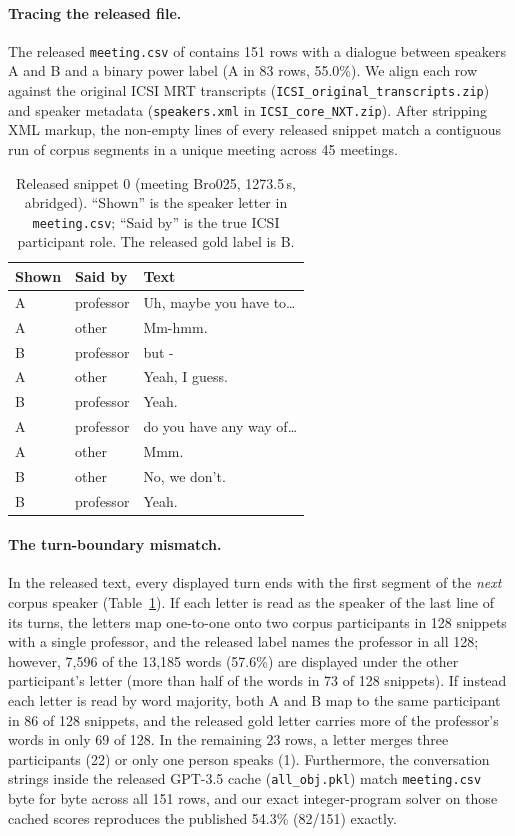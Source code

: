 \documentclass[11pt]{article}
\begin{document}
\paragraph{Tracing the released file.}
The released \texttt{meeting.csv} of \citet{wu2025power} contains 151 rows with a dialogue between speakers A and B and a binary power label (A in 83 rows, 55.0\%).
We align each row against the original ICSI MRT transcripts (\texttt{ICSI\_original\_transcripts.zip}) and speaker metadata (\texttt{speakers.xml} in \texttt{ICSI\_core\_NXT.zip}).
After stripping XML markup, the non-empty lines of every released snippet match a contiguous run of corpus segments in a unique meeting across 45 meetings.

\begin{table}[t]
\centering\small
\begin{tabular}{lll}
\toprule
Shown & Said by & Text \\
\midrule
A & professor & Uh, maybe you have to\ldots \\
A & other & Mm-hmm. \\
B & professor & but - \\
A & other & Yeah, I guess. \\
B & professor & Yeah. \\
A & professor & do you have any way of\ldots \\
A & other & Mmm. \\
B & other & No, we don't. \\
B & professor & Yeah. \\
\bottomrule
\end{tabular}
\caption{Released snippet 0 (meeting Bro025, 1273.5\,s, abridged). ``Shown'' is the speaker letter in \texttt{meeting.csv}; ``Said by'' is the true ICSI participant role. The released gold label is B.}
\label{tab:example}
\end{table}

\paragraph{The turn-boundary mismatch.}
In the released text, every displayed turn ends with the first segment of the \emph{next} corpus speaker (Table~\ref{tab:example}).
If each letter is read as the speaker of the last line of its turns, the letters map one-to-one onto two corpus participants in 128 snippets with a single professor, and the released label names the professor in all 128; however, 7,596 of the 13,185 words (57.6\%) are displayed under the other participant's letter (more than half of the words in 73 of 128 snippets).
If instead each letter is read by word majority, both A and B map to the same participant in 86 of 128 snippets, and the released gold letter carries more of the professor's words in only 69 of 128.
In the remaining 23 rows, a letter merges three participants (22) or only one person speaks (1).
Furthermore, the conversation strings inside the released GPT-3.5 cache (\texttt{all\_obj.pkl}) match \texttt{meeting.csv} byte for byte across all 151 rows, and our exact integer-program solver on those cached scores reproduces the published 54.3\% (82/151) exactly.
\end{document}
